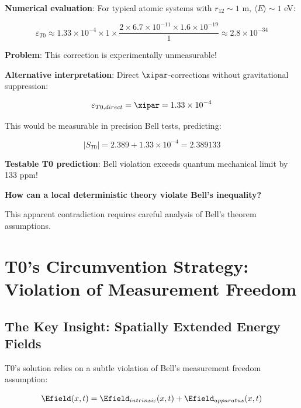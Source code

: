 	\textbf{Numerical evaluation}: For typical atomic systems with $r_{12} \sim 1$ m, $\langle E \rangle \sim 1$ eV:
	
	\begin{equation}
		\varepsilon_{T0} \approx 1.33 \times 10^{-4} \times 1 \times \frac{2 \times 6.7 \times 10^{-11} \times 1.6 \times 10^{-19}}{1} \approx 2.8 \times 10^{-34}
	\end{equation}
	
	\textbf{Problem}: This correction is experimentally unmeasurable!
	
	\textbf{Alternative interpretation}: Direct $\xipar$-corrections without gravitational suppression:
	
	\begin{equation}
		\varepsilon_{T0,direct} = \xipar = 1.33 \times 10^{-4}
	\end{equation}
	
	This would be measurable in precision Bell tests, predicting:
	
	\begin{equation}
		|S_{T0}| = 2.389 + 1.33 \times 10^{-4} = 2.389133
	\end{equation}
	
	\textbf{Testable T0 prediction}: Bell violation exceeds quantum mechanical limit by 133 ppm!
	
	\begin{tcolorbox}[colback=yellow!5!white,colframe=orange!75!black,title=Critical Question]
		\textbf{How can a local deterministic theory violate Bell's inequality?}
		
		This apparent contradiction requires careful analysis of Bell's theorem assumptions.
	\end{tcolorbox}
	
	\section{T0's Circumvention Strategy: Violation of Measurement Freedom}
	
	\subsection{The Key Insight: Spatially Extended Energy Fields}
	
	T0's solution relies on a subtle violation of Bell's measurement freedom assumption:
	
	\begin{equation}
		\Efield(x,t) = \Efield_{intrinsic}(x,t) + \Efield_{apparatus}(x,t)
	\end{equation}
	
